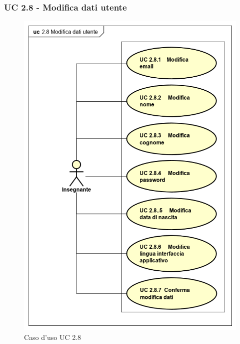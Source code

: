 \subsubsection{UC 2.8 - Modifica dati utente}
\begin{figure}[H]
\centering
\includegraphics[width=12cm, keepaspectratio]{img/modificadatiutenteinsegnante.png} 
\caption{Caso d'uso UC 2.8}
\end{figure}

